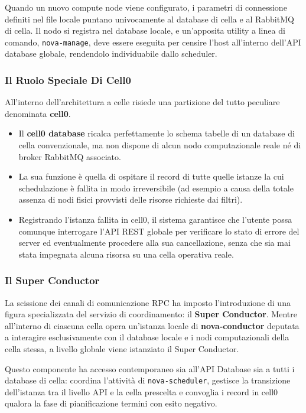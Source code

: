 \documentclass[11pt, a4paper]{article}
\begin{document}
Quando un nuovo compute node viene configurato, i parametri di connessione definiti nel file locale puntano univocamente al database di cella e al RabbitMQ di cella. Il nodo si registra nel database locale, e un'apposita utility a linea di comando, \texttt{nova-manage}, deve essere eseguita per censire l'host all'interno dell'API database globale, rendendolo individuabile dallo scheduler.

\subsubsection{Il Ruolo Speciale Di Cell0}

All'interno dell'architettura a celle risiede una partizione del tutto peculiare denominata \textbf{cell0}.
\begin{itemize}[leftmargin=*]
    \item Il \textbf{cell0 database} ricalca perfettamente lo schema tabelle di un database di cella convenzionale, ma non dispone di alcun nodo computazionale reale né di broker RabbitMQ associato.
    \item La sua funzione è quella di ospitare il record di tutte quelle istanze la cui schedulazione è fallita in modo irreversibile (ad esempio a causa della totale assenza di nodi fisici provvisti delle risorse richieste dai filtri).
    \item Registrando l'istanza fallita in cell0, il sistema garantisce che l'utente possa comunque interrogare l'API REST globale per verificare lo stato di errore del server ed eventualmente procedere alla sua cancellazione, senza che sia mai stata impegnata alcuna risorsa su una cella operativa reale.
\end{itemize}

\subsubsection{Il Super Conductor}

La scissione dei canali di comunicazione RPC ha imposto l'introduzione di una figura specializzata del servizio di coordinamento: il \textbf{Super Conductor}. Mentre all'interno di ciascuna cella opera un'istanza locale di \textbf{nova-conductor} deputata a interagire esclusivamente con il database locale e i nodi computazionali della cella stessa, a livello globale viene istanziato il Super Conductor.

Questo componente ha accesso contemporaneo sia all'API Database sia a tutti i database di cella: coordina l'attività di \texttt{nova-scheduler}, gestisce la transizione dell'istanza tra il livello API e la cella prescelta e convoglia i record in cell0 qualora la fase di pianificazione termini con esito negativo.
\end{document}
